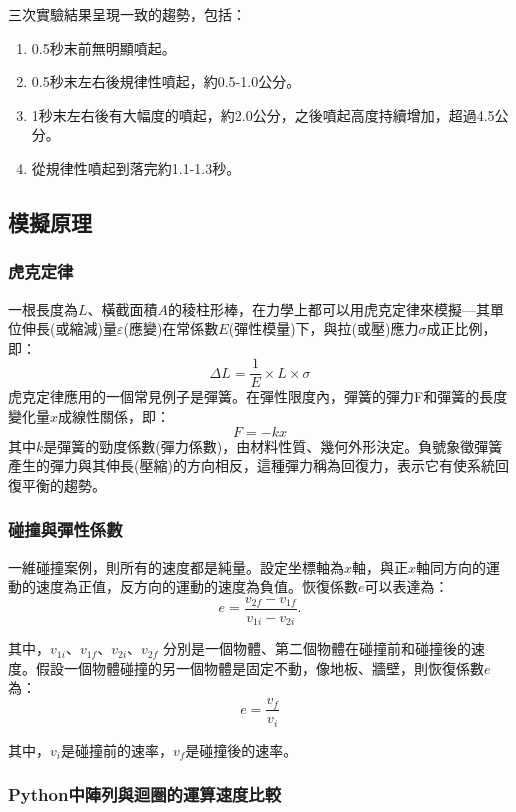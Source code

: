 \documentclass[11pt,twoside,b5paper]{article}
\begin{document}
三次實驗結果呈現一致的趨勢，包括：

\begin{enumerate}
    \item 0.5秒末前無明顯噴起。
    \item 0.5秒末左右後規律性噴起，約0.5-1.0公分。
    \item 1秒末左右後有大幅度的噴起，約2.0公分，之後噴起高度持續增加，超過4.5公分。
    \item 從規律性噴起到落完約1.1-1.3秒。
\end{enumerate}

\subsection{模擬原理}

\subsubsection{虎克定律 \cite{Hooke}}
    一根長度為$L$、橫截面積$A$的稜柱形棒，在力學上都可以用虎克定律來模擬—其單位伸長(或縮減)量$\varepsilon$(應變)在常係數$Ε$(彈性模量)下，與拉(或壓)應力$\sigma$成正比例，即：
    \[
        \Delta L=\frac{1}{E}\times L\times \sigma
    \]
    虎克定律應用的一個常見例子是彈簧。在彈性限度內，彈簧的彈力F和彈簧的長度變化量$x$成線性關係，即：
    \[
        F=-kx
    \]
    其中$k$是彈簧的勁度係數(彈力係數)，由材料性質、幾何外形決定。負號象徵彈簧產生的彈力與其伸長(壓縮)的方向相反，這種彈力稱為回復力，表示它有使系統回復平衡的趨勢。

\subsubsection{	碰撞與彈性係數 \cite{Re}}

一維碰撞案例，則所有的速度都是純量。設定坐標軸為$x$軸，與正$x$軸同方向的運動的速度為正值，反方向的運動的速度為負值。恢復係數$e$可以表達為：
    \[
        e=\frac{v_{2f}-v_{1f}}{v_{1i}-v_{2i}}.
    \]

其中，$v_{1i}$、$v_{1f}$、$v_{2i}$、$v_{2f}$ 分別是一個物體、第二個物體在碰撞前和碰撞後的速度。假設一個物體碰撞的另一個物體是固定不動，像地板、牆壁，則恢復係數$e$為：
\[
    e=\frac{v_f}{v_i}
\]

其中，$v_i$是碰撞前的速率，$v_f$是碰撞後的速率。

\subsubsection{Python中陣列與迴圈的運算速度比較 \cite{Py} }
\end{document}
